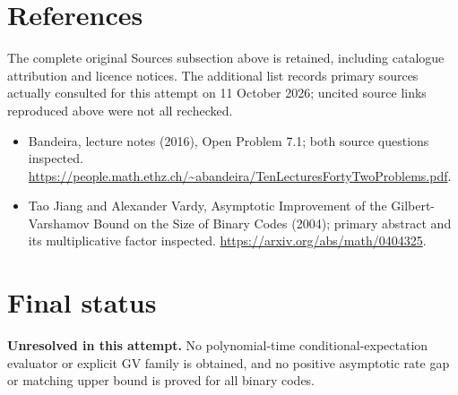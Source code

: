 \documentclass[11pt]{article}
\begin{document}
\section{References}
The complete original Sources subsection above is retained, including catalogue attribution and licence notices. The additional list records primary sources actually consulted for this attempt on 11 October 2026; uncited source links reproduced above were not all rechecked.
\begin{itemize}
\item Bandeira, lecture notes (2016), Open Problem 7.1; both source questions inspected. \url{https://people.math.ethz.ch/~abandeira/TenLecturesFortyTwoProblems.pdf}.
\item Tao Jiang and Alexander Vardy, Asymptotic Improvement of the Gilbert-Varshamov Bound on the Size of Binary Codes (2004); primary abstract and its multiplicative factor inspected. \url{https://arxiv.org/abs/math/0404325}.
\end{itemize}
\section{Final status}
\textbf{Unresolved in this attempt.} No polynomial-time conditional-expectation evaluator or explicit GV family is obtained, and no positive asymptotic rate gap or matching upper bound is proved for all binary codes.
\end{document}
